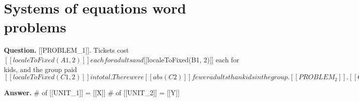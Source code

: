 \documentclass{article}
\begin{document}
\section*{Systems of equations word problems}
\textbf{Question.} [[PROBLEM\_1]]. Tickets cost $[[localeToFixed(A1, 2)]] each for adults and $[[localeToFixed(B1, 2)]] each for kids, and the group paid $[[localeToFixed(C1, 2)]] in total. There were [[abs(C2)]] fewer adults than kids in the group.
                        [[PROBLEM_2]].
                    
                    
                        [[C1]] people attended a baseball game. Everyone there was a fan of either the home team or the away team.
                        The number of home team fans was [[abs(C2)]] less than [[abs(B2)]] times the number of away team fans.
                        How many home team and away team fans attended the game?$

\textbf{Answer.} \# of [[UNIT\_1]] = [[X]]
                    \# of [[UNIT\_2]] = [[Y]]
\end{document}
